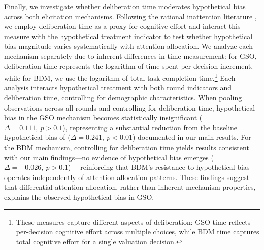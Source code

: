 \documentclass[12pt]{article}
\begin{document}
Finally, we investigate whether deliberation time moderates hypothetical bias across both elicitation mechanisms. Following the rational inattention literature \citep{sims2003implications, alaoui2016endogenous}, we employ deliberation time as a proxy for cognitive effort and interact this measure with the hypothetical treatment indicator to test whether hypothetical bias magnitude varies systematically with attention allocation. We analyze each mechanism separately due to inherent differences in time measurement: for GSO, deliberation time represents the logarithm of time spent per decision increment, while for BDM, we use the logarithm of total task completion time.\footnote{These measures capture different aspects of deliberation: GSO time reflects per-decision cognitive effort across multiple choices, while BDM time captures total cognitive effort for a single valuation decision.} Each analysis interacts hypothetical treatment with both round indicators and deliberation time, controlling for demographic characteristics. When pooling observations across all rounds and controlling for deliberation time, hypothetical bias in the GSO mechanism becomes statistically insignificant (\(\Delta = 0.111,\ p > 0.1\)), representing a substantial reduction from the baseline hypothetical bias of (\(\Delta = 0.241,\ p < 0.01\)) documented in our main results. For the BDM mechanism, controlling for deliberation time yields results consistent with our main findings—no evidence of hypothetical bias emerges (\(\Delta =-0.026,\ p > 0.1\))—-reinforcing that BDM's resistance to hypothetical bias operates independently of attention allocation patterns. These findings suggest that differential attention allocation, rather than inherent mechanism properties, explains the observed hypothetical bias in GSO. 
\end{document}

